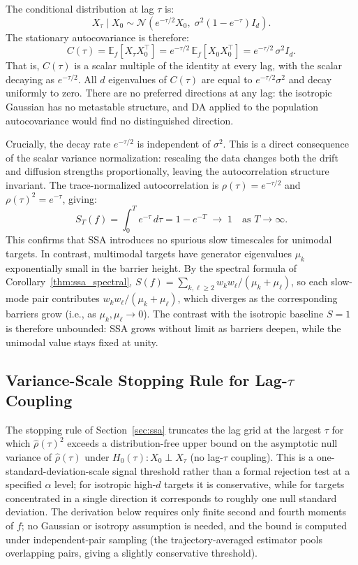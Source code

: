 \documentclass{article}
\newcommand{\E}{\mathbb{E}}
\begin{document}
The conditional distribution at lag $\tau$ is:
\[
X_\tau \mid X_0 \sim \mathcal{N}\!\left(e^{-\tau/2}X_0,\;\sigma^2(1 - e^{-\tau})I_d\right).
\]
The stationary autocovariance is therefore:
\[
C(\tau) = \E_f[X_\tau X_0^\top] = e^{-\tau/2}\,\E_f[X_0 X_0^\top] = e^{-\tau/2}\,\sigma^2 I_d.
\]
That is, $C(\tau)$ is a scalar multiple of the identity at every lag, with the scalar decaying as $e^{-\tau/2}$. All $d$ eigenvalues of $C(\tau)$ are equal to $e^{-\tau/2}\sigma^2$ and decay uniformly to zero. There are no preferred directions at any lag: the isotropic Gaussian has no metastable structure, and DA applied to the population autocovariance would find no distinguished direction.

Crucially, the decay rate $e^{-\tau/2}$ is independent of $\sigma^2$. This is a direct consequence of the scalar variance normalization: rescaling the data changes both the drift and diffusion strengths proportionally, leaving the autocorrelation structure invariant. The trace-normalized autocorrelation is $\rho(\tau) = e^{-\tau/2}$ and $\rho(\tau)^2 = e^{-\tau}$, giving:
\[
S_T(f) = \int_0^T e^{-\tau}\,d\tau = 1 - e^{-T} \;\to\; 1 \quad\text{as } T \to \infty.
\]
This confirms that SSA introduces no spurious slow timescales for unimodal targets. In contrast, multimodal targets have generator
eigenvalues $\mu_k$ exponentially small in the barrier height. By the
spectral formula of Corollary~\ref{thm:ssa_spectral},
$S(f) = \sum_{k,\ell \geq 2} w_k w_\ell / (\mu_k + \mu_\ell)$, so each
slow-mode pair contributes $w_k w_\ell / (\mu_k + \mu_\ell)$, which
diverges as the corresponding barriers grow (i.e., as
$\mu_k, \mu_\ell \to 0$). The contrast with the isotropic baseline
$S = 1$ is therefore unbounded: SSA grows without limit as barriers
deepen, while the unimodal value stays fixed at unity.

\subsection{Variance-Scale Stopping Rule for Lag-$\tau$ Coupling}
\label{app:rho_clt}

The stopping rule of Section~\ref{sec:ssa} truncates the lag grid at the
largest $\tau$ for which $\hat\rho(\tau)^2$ exceeds a distribution-free upper bound on the asymptotic null variance of $\hat\rho(\tau)$ under $H_0(\tau): X_0 \perp X_\tau$ (no lag-$\tau$ coupling). This is a one-standard-deviation-scale signal threshold rather than a formal rejection test at a specified $\alpha$ level; for isotropic high-$d$ targets it is conservative, while for targets concentrated in a single direction it corresponds to roughly one null standard deviation. The derivation below requires only finite second and fourth moments of $f$; no Gaussian or isotropy assumption is needed, and the bound is computed under independent-pair sampling (the trajectory-averaged estimator pools overlapping pairs, giving a slightly conservative threshold).
\end{document}
